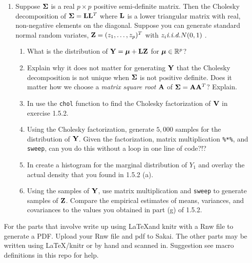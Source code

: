 \documentclass{article}\usepackage[]{graphicx}\usepackage[]{color}
\begin{document}
\begin{enumerate}
\begin{enumerate}
\end{enumerate}
\gap

\item Suppose $\boldsymbol{\Sigma}$ is a real $p \times p$ positive semi-definite
  matrix.  Then the Cholesky decomposition of
  $\boldsymbol{\Sigma} = \mathbf{L} \mathbf{L}^T$ where $\mathbf{L}$ is a lower triangular matrix with
  real, non-negative elements on the diagonal.
  Suppose you can generate standard normal random variates, $\mathbf{Z} = (z_1,
  \ldots, z_p)^T$ with $z_i \textit{i.i.d.} N(0,1)$ .

\begin{enumerate}
  \item What is the distribution of $\mathbf{Y} = \boldsymbol{\mu} + \mathbf{L} \mathbf{Z}$ for $\boldsymbol{\mu} \in \mathbb{R}^p$?
\gap

  \item Explain why it does not matter for generating $\mathbf{Y}$ that the Cholesky decomposition is not unique when $\boldsymbol{\Sigma}$ is not positive definite.  Does it matter how we choose a {\em matrix square root} $\mathbf{A}$ of $\boldsymbol{\Sigma} = \mathbf{A} \mathbf{A}^T$?  Explain.
\gap

\item In \R  use the {\tt chol} function to find the Cholesky factorization of $\mathbf{V}$ in exercise 1.5.2.
\gap

\item Using the Cholesky factorization, generate $5,000$ samples for the distribution of $\mathbf{Y}$. Given the factorization, matrix multiplication {\tt \%*\%}, and {\tt sweep}, can you do this without a loop in one line of code?!?
\gap

\item In \R create a histogram for the marginal distribution of $Y_1$ and overlay the actual density that you found in 1.5.2 (a).
\gap

\item Using the samples of $\mathbf{Y}$, use matrix multiplication and {\tt sweep} to generate samples of $\mathbf{Z}$.  Compare the empirical estimates of means, variances, and covariances to the values you obtained in part (g) of 1.5.2.

\end{enumerate}
\end{enumerate}

For the parts that involve \R write up using \LaTeX and knitr with a Rnw file to generate a PDF.  Upload your Rnw file and pdf to Sakai. The other parts may be written using  \LaTeX/knitr or by hand and scanned in.  Suggestion see macro definitions in this repo for help.
\end{document}
